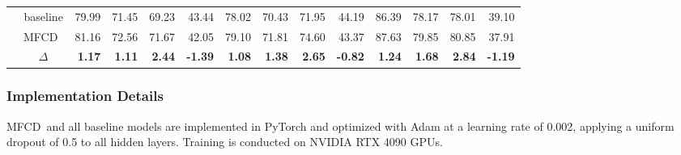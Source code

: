 \documentclass[a4paper,runningheads]{llncs}
\def\mymethod{MFCD}
\newcommand{\redbf}[1]{\textcolor{myred}{\textbf{#1}}} %
\begin{document}
\begin{table}[!t]
{\begin{tabular}{cc|rrrr|rrrr|rrrr}

\rowcolor{mybgc}& baseline & 79.99 & 71.45 & 69.23 & 43.44 & 78.02 & 70.43 & 71.95 & 44.19 & 86.39 & 78.17 & 78.01 & 39.10 \\
                       \rowcolor{mybgc}& \mymethod\ & 81.16 & 72.56 & 71.67 & 42.05 & 79.10 & 71.81 & 74.60 & 43.37 & 87.63 & 79.85 & 80.85 & 37.91 \\
\rowcolor{mybgc}  \multirow{-3}{*}{FairWISA}                      & $\Delta$ & \redbf{1.17} & \redbf{1.11} & \redbf{2.44} & \redbf{-1.39} & \redbf{1.08} & \redbf{1.38} & \redbf{2.65} & \redbf{-0.82} & \redbf{1.24} & \redbf{1.68} & \redbf{2.84} & \redbf{-1.19} \\



\bottomrule
\end{tabular}
}
\end{table}

\subsubsection{Implementation Details}
\mymethod\ and all baseline models are implemented in PyTorch and optimized with Adam at a learning rate of 0.002, applying a uniform dropout of 0.5 to all hidden layers. Training is conducted on NVIDIA RTX 4090 GPUs.


\end{document}
